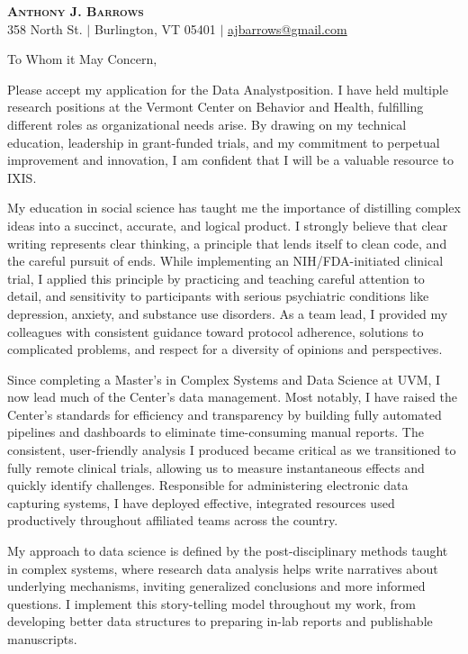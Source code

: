 \documentclass[letterpaper,11pt]{article}
\newcommand{\company}{IXIS}
\newcommand{\position}{Data Analyst}
\begin{document}
\begin{center}
    \textbf{\Huge \scshape Anthony J. Barrows} \\ \vspace{3pt}
    \small 358 North St. $|$
    \small Burlington, VT 05401 $|$
    \href{mailto:ajbarrows@gmail.com}{ajbarrows@gmail.com}
\end{center}
\vspace{5mm}
	
	To Whom it May Concern,
	\vspace{3mm}
	
	Please accept my application for the \position \space position. I have held multiple research positions at the Vermont Center on Behavior and Health, fulfilling different roles as organizational needs arise. By drawing on my technical education, leadership in grant-funded trials, and my commitment to perpetual improvement and innovation, I am confident that I will be a valuable resource to \company.
	
	
	My education in social science has taught me the importance of distilling complex ideas into a succinct, accurate, and logical product. I strongly believe that clear writing represents clear thinking, a principle that lends itself to clean code, and the careful pursuit of ends. While implementing an NIH/FDA-initiated clinical trial, I applied this principle by practicing and teaching careful attention to detail, and sensitivity to participants with serious psychiatric conditions like depression, anxiety, and substance use disorders. As a team lead, I provided my colleagues with consistent guidance toward protocol adherence, solutions to complicated problems, and respect for a diversity of opinions and perspectives.
	
	
	Since completing a Master's in Complex Systems and Data Science at UVM, I now lead much of the Center's data management. Most notably, I have raised the Center’s standards for efficiency and transparency by building fully automated pipelines and dashboards to eliminate time-consuming manual reports. The consistent, user-friendly analysis I produced became critical as we transitioned to fully remote clinical trials, allowing us to measure instantaneous effects and quickly identify challenges. Responsible for administering electronic data capturing systems, I have deployed effective, integrated resources used productively throughout affiliated teams across the country.
	
	My approach to data science is defined by the post-disciplinary methods taught in complex systems, where research data analysis helps write narratives about underlying mechanisms, inviting generalized conclusions and more informed questions. I implement this story-telling model throughout my work, from developing better data structures to preparing in-lab reports and publishable manuscripts.
	
\end{document}
